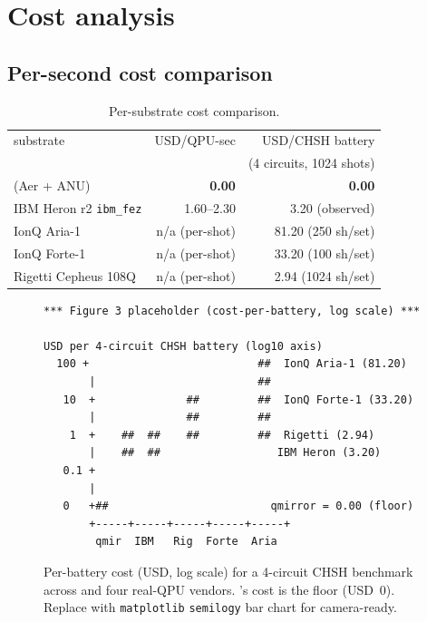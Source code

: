 \section{Cost analysis}\label{sec:cost}

\subsection{Per-second cost comparison}

\begin{table}[htbp]
\centering
\caption{Per-substrate cost comparison.}
\label{tab:cost_per_substrate}
\footnotesize
\begin{tabular}{l r r}
\toprule
substrate & USD/QPU-sec & USD/CHSH battery \\
          &             & (4 circuits, 1024 shots) \\
\midrule
\qmirror{} (Aer + ANU)         & \textbf{0.00} & \textbf{0.00} \\
IBM Heron r2 \texttt{ibm\_fez} & 1.60--2.30    & 3.20 (observed) \\
IonQ Aria-1                    & n/a (per-shot) & 81.20 (250 sh/set) \\
IonQ Forte-1                   & n/a (per-shot) & 33.20 (100 sh/set) \\
Rigetti Cepheus 108Q           & n/a (per-shot) & 2.94  (1024 sh/set) \\
\bottomrule
\end{tabular}
\end{table}

\begin{figure}[htbp]
\centering
\begin{lstlisting}[basicstyle=\ttfamily\tiny,frame=single,framesep=4pt]
*** Figure 3 placeholder (cost-per-battery, log scale) ***

USD per 4-circuit CHSH battery (log10 axis)
  100 +                          ##  IonQ Aria-1 (81.20)
       |                         ##
   10  +              ##         ##  IonQ Forte-1 (33.20)
       |              ##         ##
    1  +    ##  ##    ##         ##  Rigetti (2.94)
       |    ##  ##                  IBM Heron (3.20)
   0.1 +
       |
   0   +##                         qmirror = 0.00 (floor)
       +-----+-----+-----+-----+-----+
        qmir  IBM   Rig  Forte  Aria
\end{lstlisting}
\caption{Per-battery cost (USD, log scale) for a 4-circuit CHSH
benchmark across \qmirror{} and four real-QPU vendors. \qmirror{}'s
cost is the floor (USD~0). Replace with \texttt{matplotlib} \texttt{semilogy} bar
chart for camera-ready.}
\label{fig:cost_bar}
\end{figure}


